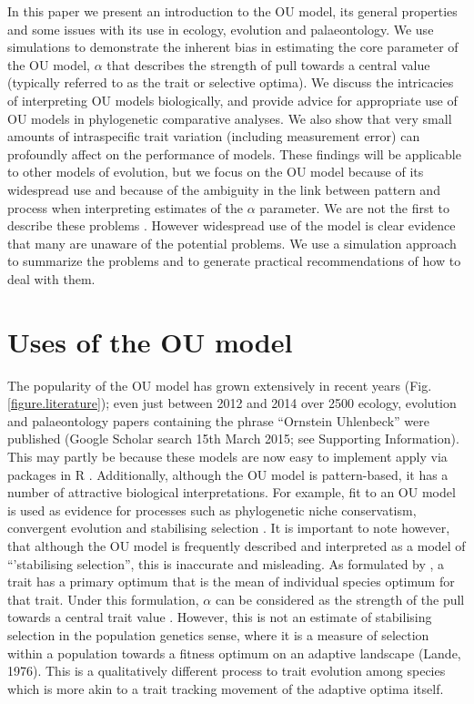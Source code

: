 \documentclass[a4paper,12pt]{article}
\begin{document}
  In this paper we present an introduction to the OU model, its general properties and some issues with its use in ecology, evolution and palaeontology.
  We use simulations to demonstrate the inherent bias in estimating the core parameter of the OU model, $\alpha$ that describes the strength of pull towards a central value (typically referred to as the trait or selective optima). We discuss the intricacies of interpreting OU models biologically, and provide advice for appropriate use of OU models in phylogenetic comparative analyses. 
  We also show that very small amounts of intraspecific trait variation (including measurement error) can profoundly affect on the performance of models. 
  These findings will be applicable to other models of evolution, but we focus on the OU model because of its widespread use and because of the ambiguity in the link between pattern and process when interpreting estimates of the $\alpha$ parameter. 
  We are not the first to describe these problems \citep[e.g.,][]{ho2013asymptotic,ho2014intrinsic,boettiger2012your,hansen2012interpreting,ives2010phylogenetic}. 
  However widespread use of the model is clear evidence that many are unaware of the potential problems. We use a simulation approach to summarize the problems and to generate practical recommendations of how to deal with them. 

\section{Uses of the OU model}
  The popularity of the OU model has grown extensively in recent years (Fig. \ref{figure.literature}); even just between 2012 and 2014 over 2500 ecology, evolution and palaeontology papers containing the phrase ``Ornstein Uhlenbeck'' were published (Google Scholar search 15th March 2015; see Supporting Information).
  This may partly be because these models are now easy to implement apply via packages in R \citep[e.g. ouch, GEIGER and OUwie;][]{Butler:2004aa,Harmon:2008aa,beaulieu2012ouwie}. 
  Additionally, although the OU model is pattern-based, it has a number of attractive biological interpretations. 
  For example, fit to an OU model is used as evidence for processes such as phylogenetic niche conservatism, convergent evolution and stabilising selection \citep[e.g.,][]{Wiens:2010aa,christin2013anatomical,ingram2013surface}. 
  It is important to note however, that although the OU model is frequently described and interpreted as a model of ``'stabilising selection'', this is inaccurate and misleading. 
  As formulated by \citet{hansen1997stabilizing}, a trait has a primary optimum that is the mean of individual species optimum for that trait. 
  Under this formulation, $\alpha$ can be considered as the strength of the pull towards a central trait value \citep[the primary optimum;][]{hansen2012adaptive}. 
  However, this is not an estimate of stabilising selection in the population genetics sense, where it is a measure of selection within a population towards a fitness optimum on an adaptive landscape (Lande, 1976). This is a qualitatively different process to trait evolution among species which is more akin to a trait tracking movement of the adaptive optima itself. 
\end{document}

